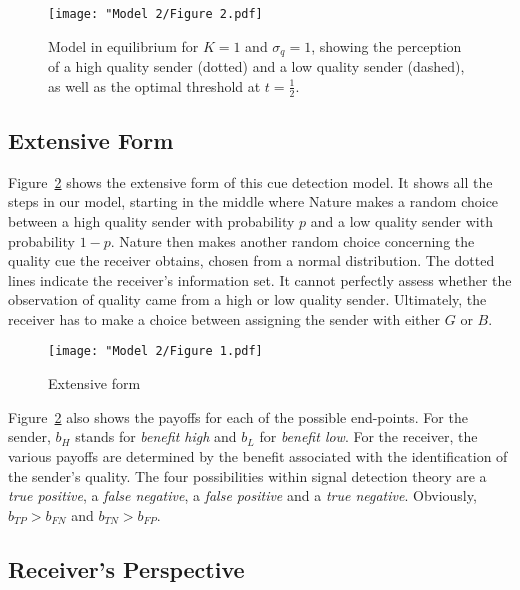 \documentclass[a4paper,12pt]{article}
\numberwithin{equation}{section}
\begin{document}
\begin{figure}[h]
\captionsetup{width=340pt}
\begin{center}
\leavevmode
\texttt{[image: "Model 2/Figure 2.pdf]}
\caption{Model in equilibrium for $K=1$ and $\sigma_{q}=1$, showing the perception of a high quality sender (dotted) and a low quality sender (dashed), as well as the optimal threshold at $t=\frac{1}{2}$.}
\label{fig:Model 2/Figure 2.pdf}
\end{center}
\end{figure}


\subsection{Extensive Form}
\label{sec:CueDetectionModel/Extensive Form}

Figure~\ref{fig:Model 2/Figure 1.pdf} shows the extensive form of this cue detection model. It shows all the steps in our model, starting in the middle where Nature makes a random choice between a high quality sender with probability $p$ and a low quality sender with probability $1-p$. Nature then makes another random choice concerning the quality cue the receiver obtains, chosen from a normal distribution. The dotted lines indicate the receiver's information set. It cannot perfectly assess whether the observation of quality came from a high or low quality sender. Ultimately, the receiver has to make a choice between assigning the sender with either $G$ or $B$.

\begin{figure}[h]
\begin{center}
\leavevmode
\texttt{[image: "Model 2/Figure 1.pdf]}
\caption{Extensive form}
\label{fig:Model 2/Figure 1.pdf}
\end{center}
\end{figure}

Figure~\ref{fig:Model 2/Figure 1.pdf} also shows the payoffs for each of the possible end-points. For the sender, $b_{H}$ stands for \textit{benefit high} and $b_{L}$ for \textit{benefit low}. For the receiver, the various payoffs are determined by the benefit associated with the identification of the sender's quality. The four possibilities within signal detection theory are a \textit{true positive}, a \textit{false negative}, a \textit{false positive} and a \textit{true negative}. Obviously, $b_{TP}>b_{FN}$ and $b_{TN}>b_{FP}$.


\subsection{Receiver's Perspective}
\label{sec:CueDetectionModel/Receiver's Perspective}
\end{document}
